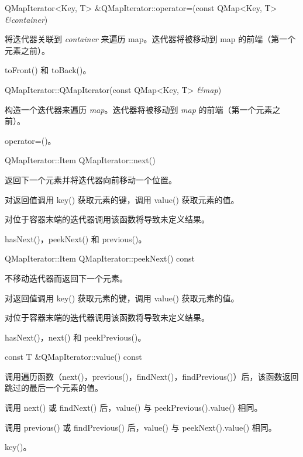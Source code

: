 QMapIterator<Key, T> \&QMapIterator::operator=(const QMap<Key, T> \emph{\&container})

将迭代器关联到 \emph{container} 来遍历 map。迭代器将被移动到 map 的前端（第一个元素之前）。


\begin{notice}[另请参阅]
toFront() 和 toBack()。
\end{notice}

\splitLine

QMapIterator::QMapIterator(const QMap<Key, T> \emph{\&map})

构造一个迭代器来遍历 \emph{map}。迭代器将被移动到 \emph{map} 的前端（第一个元素之前）。


\begin{notice}[另请参阅]
operator=()。
\end{notice}

\splitLine

QMapIterator::Item QMapIterator::next()

返回下一个元素并将迭代器向前移动一个位置。

对返回值调用 key() 获取元素的键，调用 value() 获取元素的值。

对位于容器末端的迭代器调用该函数将导致未定义结果。

\begin{notice}[另请参阅]
hasNext()，peekNext() 和 previous()。
\end{notice}
    
\splitLine

QMapIterator::Item QMapIterator::peekNext() const

不移动迭代器而返回下一个元素。

对返回值调用 key() 获取元素的键，调用 value() 获取元素的值。

对位于容器末端的迭代器调用该函数将导致未定义结果。

\begin{notice}[另请参阅]
hasNext()，next() 和 peekPrevious()。
\end{notice}

\splitLine

const T \&QMapIterator::value() const

调用遍历函数（next()，previous()，findNext()，findPrevious()）后，该函数返回跳过的最后一个元素的值。

调用 next() 或 findNext() 后，value() 与 peekPrevious().value() 相同。

调用 previous() 或 findPrevious() 后，value() 与 peekNext().value() 相同。

\begin{notice}[另请参阅]
key()。
\end{notice}
